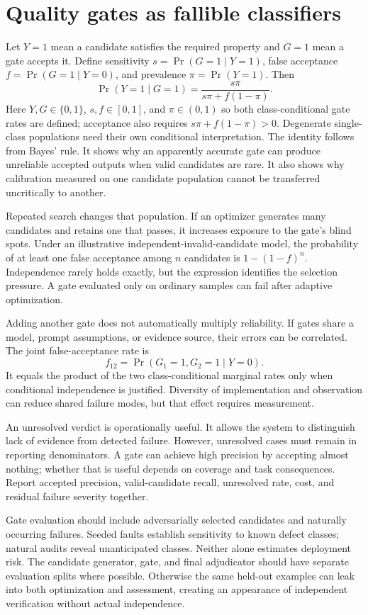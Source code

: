 \section{Quality gates as fallible classifiers}\label{sec:C25:gates}
Let $Y=1$ mean a candidate satisfies the required property and $G=1$ mean a gate accepts it. Define sensitivity $s=\Pr(G=1\mid Y=1)$, false acceptance $f=\Pr(G=1\mid Y=0)$, and prevalence $\pi=\Pr(Y=1)$. Then
\begin{equation}
 \Pr(Y=1\mid G=1)=
 \frac{s\pi}{s\pi+f(1-\pi)}.
\end{equation}
Here $Y,G\in\{0,1\}$, $s,f\in[0,1]$, and $\pi\in(0,1)$ so both class-conditional gate rates are defined; acceptance also requires $s\pi+f(1-\pi)>0$. Degenerate single-class populations need their own conditional interpretation. The identity follows from Bayes' rule. It shows why an apparently accurate gate can produce unreliable accepted outputs when valid candidates are rare. It also shows why calibration measured on one candidate population cannot be transferred uncritically to another.

Repeated search changes that population. If an optimizer generates many candidates and retains one that passes, it increases exposure to the gate's blind spots. Under an illustrative independent-invalid-candidate model, the probability of at least one false acceptance among $n$ candidates is $1-(1-f)^n$. Independence rarely holds exactly, but the expression identifies the selection pressure. A gate evaluated only on ordinary samples can fail after adaptive optimization.

Adding another gate does not automatically multiply reliability. If gates share a model, prompt assumptions, or evidence source, their errors can be correlated. The joint false-acceptance rate is
\begin{equation}
 f_{12}=\Pr(G_1=1,G_2=1\mid Y=0).
\end{equation}
It equals the product of the two class-conditional marginal rates only when conditional independence is justified. Diversity of implementation and observation can reduce shared failure modes, but that effect requires measurement.

An unresolved verdict is operationally useful. It allows the system to distinguish lack of evidence from detected failure. However, unresolved cases must remain in reporting denominators. A gate can achieve high precision by accepting almost nothing; whether that is useful depends on coverage and task consequences. Report accepted precision, valid-candidate recall, unresolved rate, cost, and residual failure severity together.

Gate evaluation should include adversarially selected candidates and naturally occurring failures. Seeded faults establish sensitivity to known defect classes; natural audits reveal unanticipated classes. Neither alone estimates deployment risk. The candidate generator, gate, and final adjudicator should have separate evaluation splits where possible. Otherwise the same held-out examples can leak into both optimization and assessment, creating an appearance of independent verification without actual independence.

